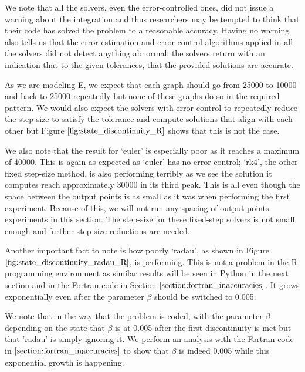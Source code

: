 We note that all the solvers, even the error-controlled ones, did not issue a warning about the integration and thus researchers may be tempted to think that their code has solved the problem to a reasonable accuracy. Having no warning also tells us that the error estimation and error control algorithms applied in all the solvers did not detect anything abnormal; the solvers return with an indication that to the given tolerances, that the provided solutions are accurate.

As we are modeling E, we expect that each graph should go from 25000 to 10000 and back to 25000 repeatedly but none of these graphs do so in the required pattern. We would also expect the solvers with error control to repeatedly reduce the step-size to satisfy the tolerance and compute solutions that align with each other but Figure $\ref{fig:state_discontinuity_R}$ shows that this is not the case.

We also note that the result for `euler' is especially poor as it reaches a maximum of 40000. This is again as expected as `euler' has no error control; `rk4', the other fixed step-size method, is also performing terribly as we see the solution it computes reach approximately 30000 in its third peak. This is all even though the space between the output points is as small as it was when performing the first experiment. Because of this, we will not run any spacing of output points experiments in this section. The step-size for these fixed-step solvers is not small enough and further step-size reductions are needed.

Another important fact to note is how poorly `radau', as shown in Figure $\ref{fig:state_discontinuity_radau_R}$, is performing. This is not a problem in the R programming environment as similar results will be seen in Python in the next section and in the Fortran code in Section $\ref{section:fortran_inaccuracies}$. It grows exponentially even after the parameter $\beta$ should be switched to 0.005. 

We note that in the way that the problem is coded, with the parameter $\beta$ depending on the state that $\beta$ is at 0.005 after the first discontinuity is met but that 'radau' is simply ignoring it. We perform an analysis with the Fortran code in $\ref{section:fortran_inaccuracies}$ to show that $\beta$ is indeed 0.005 while this exponential growth is happening. 

